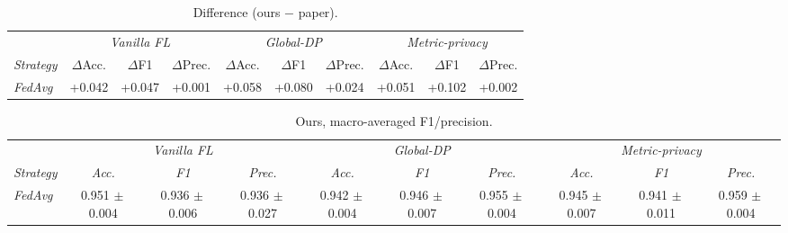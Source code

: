\documentclass[11pt]{article}
\begin{document}
\begin{table}[h]
\centering
\caption{Difference (ours $-$ paper).}
\begin{tabular}{l ccc ccc ccc}
\toprule
& \multicolumn{3}{c}{\emph{Vanilla FL}} & \multicolumn{3}{c}{\emph{Global-DP}} & \multicolumn{3}{c}{\emph{Metric-privacy}} \\
\cmidrule(lr){2-4}\cmidrule(lr){5-7}\cmidrule(lr){8-10}
\emph{Strategy} & $\Delta$Acc. & $\Delta$F1 & $\Delta$Prec. & $\Delta$Acc. & $\Delta$F1 & $\Delta$Prec. & $\Delta$Acc. & $\Delta$F1 & $\Delta$Prec. \\
\midrule
\emph{FedAvg} & +0.042 & +0.047 & +0.001 & +0.058 & +0.080 & +0.024 & +0.051 & +0.102 & +0.002 \\
\bottomrule
\end{tabular}
\end{table}

\begin{table}[h]
\centering
\caption{Ours, macro-averaged F1/precision.}
\begin{tabular}{l ccc ccc ccc}
\toprule
& \multicolumn{3}{c}{\emph{Vanilla FL}} & \multicolumn{3}{c}{\emph{Global-DP}} & \multicolumn{3}{c}{\emph{Metric-privacy}} \\
\cmidrule(lr){2-4}\cmidrule(lr){5-7}\cmidrule(lr){8-10}
\emph{Strategy} & \emph{Acc.} & \emph{F1} & \emph{Prec.} & \emph{Acc.} & \emph{F1} & \emph{Prec.} & \emph{Acc.} & \emph{F1} & \emph{Prec.} \\
\midrule
\emph{FedAvg} & 0.951 {\scriptsize$\pm$\,0.004} & 0.936 {\scriptsize$\pm$\,0.006} & 0.936 {\scriptsize$\pm$\,0.027} & 0.942 {\scriptsize$\pm$\,0.004} & 0.946 {\scriptsize$\pm$\,0.007} & 0.955 {\scriptsize$\pm$\,0.004} & 0.945 {\scriptsize$\pm$\,0.007} & 0.941 {\scriptsize$\pm$\,0.011} & 0.959 {\scriptsize$\pm$\,0.004} \\
\bottomrule
\end{tabular}
\end{table}
\end{document}
